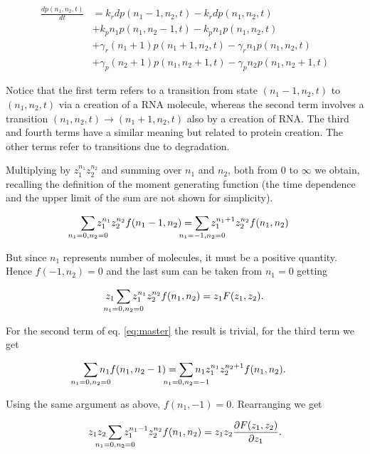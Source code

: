 \begin{equation}
  \label{eq:master}
  \begin{split}
    \frac{dp(n_1,n_2,t)}{dt} &= k_rdp(n_1-1,n_2,t) - k_rdp(n_1,n_2,t)\\
&+ k_pn_1p(n_1,n_2-1,t) - k_pn_1p(n_1,n_2,t)\\
&+ \gamma_r(n_1+1)p(n_1+1,n_2,t) - \gamma_rn_1p(n_1,n_2,t)\\
&+ \gamma_p(n_2+1)p(n_1,n_2+1,t) - \gamma_pn_2p(n_1,n_2+1,t)
  \end{split}
\end{equation}

Notice that the first term refers to a transition from state $(n_1-1,n_2,t)$ to $(n_1,n_2,t)$ via a creation of a RNA molecule, whereas the second term involves a transition $(n_1,n_2,t) \rightarrow (n_1+1,n_2,t)$ also by a creation of RNA. The third and fourth terms have a similar meaning but related to protein creation. The other terms refer to transitions due to degradation.

Multiplying by $z_1^{n_1}z_2^{n_2}$ and summing over $n_1$ and $n_2$, both from $0$ to $\infty$ we obtain, recalling the definition of the moment generating function (the time dependence and the upper limit of the sum are not shown for simplicity).

\begin{equation*}
\sum_{\mathclap{n_1=0,n_2=0}} z_1^{n_1}z_2^{n_2}f(n_1-1,n_2) = \sum_{\mathclap{n_1=-1,n_2=0}}z_1^{n_1+1}z_2^{n_2}f(n_1,n_2)
\end{equation*}

But since $n_1$ represents number of molecules, it must be a positive quantity. Hence $f(-1,n_2)=0$ and the last sum can be taken from $n_1=0$ getting

\begin{equation}
\label{eq:mom1}
z_1 \sum_{\mathclap{n_1=0,n_2=0}}z_1^{n_1}z_2^{n_2}f(n_1,n_2) = z_1F(z_1,z_2).
\end{equation}

For the second term of eq. \ref{eq:master} the result is trivial, for the third term we get

\begin{equation*}
\sum_{\mathclap{n_1=0,n_2=0}}n_1f(n_1,n_2-1) = \sum_{\mathclap{n_1=0,n_2=-1}}n_1z_1^{n_1}z_2^{n_2+1}f(n_1,n_2).
\end{equation*}

Using the same argument as above, $f(n_1,-1) = 0$. Rearranging we get

\begin{equation}
z_1 z_2 \sum_{\mathclap{n_1=0,n_2=0}} z_1^{n_1-1}z_2^{n_2}f(n_1,n_2) = z_1 z_2 \frac{\partial F(z_1,z_2)}{\partial z_1}.
\end{equation}

